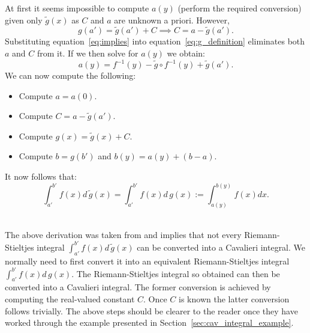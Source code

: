 \documentclass[twoside,reqno,11pt]{fcaa-var} %
\begin{document}
\noindent
At first it seems impossible to compute $a(y)$ (perform the required conversion) given only $\widetilde{g}(x)$ as $C$ and $a$ are unknown a priori. However, 
\begin{equation}
\label{eq:implies}
g(a') = \widetilde{g}(a') + C \implies C = a - \widetilde{g}(a'). 
\end{equation}
Substituting equation~\eqref{eq:implies} into equation~\eqref{eq:g_definition} eliminates both $a$ and $C$ from it. If we then solve for $a(y)$ we obtain:
\begin{equation}
a(y) = f^{-1}(y)-\widetilde{g}\circ f^{-1}(y) + \widetilde{g}(a'). 
\end{equation}
We can now compute the following:
\begin{itemize}
\item Compute $a = a(0)$.
\item Compute $C = a - \widetilde{g}(a')$.
\item Compute $g(x) = \widetilde{g}(x) + C$.
\item Compute $b = g(b')$ and $b(y) = a(y) + (b-a)$.
\end{itemize}
It now follows that: 
\begin{equation}
\int_{a'}^{b'} f(x)d\,\widetilde{g}(x) = \int_{a'}^{b'} f(x)d\,g(x):=\int_{a(y)}^{b(y)}f(x)dx. 
\end{equation}\

\noindent
The above derivation was taken from \cite{grobler19} and implies that not every Riemann-Stieltjes integral $\int_{a'}^{b'} f(x) d\,\widetilde{g}(x)$ can be converted into a Cavalieri integral. We normally need to first convert it into an equivalent Riemann-Stieltjes integral $\int_{a'}^{b'} f(x) d\,g(x)$. The Riemann-Stieltjes integral so obtained can then be converted into a Cavalieri integral. The former conversion is achieved by computing the real-valued constant $C$. Once $C$ is known the latter conversion follows trivially. The above steps should be clearer to the reader once they have worked through the example presented in Section~\ref{sec:cav_integral_example}.\\

\end{document}
